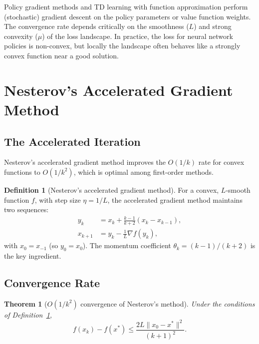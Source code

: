 \documentclass[11pt,a4paper]{article}
\theoremstyle{definition}
\newtheorem{definition}{Definition}[section]
\theoremstyle{plain}
\newtheorem{theorem}{Theorem}[section]
\theoremstyle{remark}
\begin{document}
\begin{rlconnection}
Policy gradient methods and TD learning with function approximation perform
(stochastic) gradient descent on the policy parameters or value function weights.
The convergence rate depends critically on the smoothness ($L$) and strong
convexity ($\mu$) of the loss landscape. In practice, the loss for neural network
policies is non-convex, but locally the landscape often behaves like a strongly
convex function near a good solution.
\end{rlconnection}

\section{Nesterov's Accelerated Gradient Method}\label{sec:nesterov}

\subsection{The Accelerated Iteration}

Nesterov's accelerated gradient method improves the $O(1/k)$ rate for convex
functions to $O(1/k^2)$, which is optimal among first-order methods.

\begin{definition}[Nesterov's accelerated gradient method]\label{def:nesterov}
For a convex, $L$-smooth function $f$, with step size $\eta = 1/L$, the
accelerated gradient method maintains two sequences:
\begin{equation}\label{eq:nesterov}
\begin{aligned}
  y_{k} &= x_k + \frac{k-1}{k+2}(x_k - x_{k-1}), \\
  x_{k+1} &= y_k - \frac{1}{L}\nabla f(y_k),
\end{aligned}
\end{equation}
with $x_0 = x_{-1}$ (so $y_0 = x_0$). The momentum coefficient
$\theta_k = (k-1)/(k+2)$ is the key ingredient.
\end{definition}

\subsection{Convergence Rate}

\begin{theorem}[$O(1/k^2)$ convergence of Nesterov's method]\label{thm:nesterov}
Under the conditions of Definition~\ref{def:nesterov},
\begin{equation}\label{eq:nesterov-rate}
  f(x_k) - f(x^*) \le \frac{2L\|x_0 - x^*\|^2}{(k+1)^2}.
\end{equation}
\end{theorem}
\end{document}
